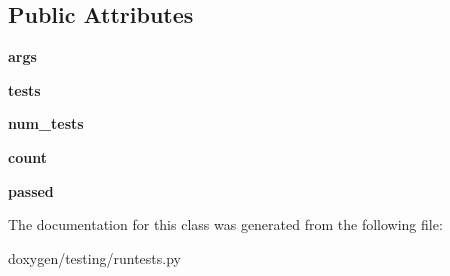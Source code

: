 \subsection*{Public Attributes}
\begin{DoxyCompactItemize}
\item 
\mbox{\label{classruntests_1_1_test_manager_a3ee42d8b0c5d711dd1c26c75f4791e07}} 
{\bfseries args}
\item 
\mbox{\label{classruntests_1_1_test_manager_a16d3179413195897834f4014ca8cb1d5}} 
{\bfseries tests}
\item 
\mbox{\label{classruntests_1_1_test_manager_ac049ee00762003b6a2b4ec22c3b274a7}} 
{\bfseries num\+\_\+tests}
\item 
\mbox{\label{classruntests_1_1_test_manager_a7018ea069c4a0588c8319e27a47df9f1}} 
{\bfseries count}
\item 
\mbox{\label{classruntests_1_1_test_manager_a9d294689fbbe167728e2171174d15440}} 
{\bfseries passed}
\end{DoxyCompactItemize}


The documentation for this class was generated from the following file\+:\begin{DoxyCompactItemize}
\item 
doxygen/testing/runtests.\+py\end{DoxyCompactItemize}
